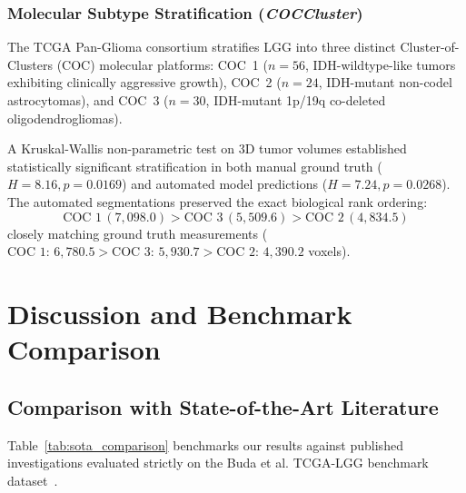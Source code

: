 \documentclass[preprint,3p,times,onecolumn]{elsarticle}
\begin{document}
\subsubsection{Molecular Subtype Stratification (\textit{COCCluster})}
The TCGA Pan-Glioma consortium stratifies LGG into three distinct Cluster-of-Clusters (COC) molecular platforms: COC~1 ($n=56$, IDH-wildtype-like tumors exhibiting clinically aggressive growth), COC~2 ($n=24$, IDH-mutant non-codel astrocytomas), and COC~3 ($n=30$, IDH-mutant 1p/19q co-deleted oligodendrogliomas).

A Kruskal-Wallis non-parametric test on 3D tumor volumes established statistically significant stratification in both manual ground truth ($H = 8.16, p = \mathbf{0.0169}$) and automated model predictions ($H = 7.24, p = \mathbf{0.0268}$). The automated segmentations preserved the exact biological rank ordering:
\begin{equation}
\text{COC 1}\,(7{,}098.0) > \text{COC 3}\,(5{,}509.6) > \text{COC 2}\,(4{,}834.5)
\end{equation}
closely matching ground truth measurements ($\text{COC 1: } 6{,}780.5 > \text{COC 3: } 5{,}930.7 > \text{COC 2: } 4{,}390.2$ voxels).

\section{Discussion and Benchmark Comparison}
\label{sec:discussion}

\subsection{Comparison with State-of-the-Art Literature}
Table~\ref{tab:sota_comparison} benchmarks our results against published investigations evaluated strictly on the Buda et al. TCGA-LGG benchmark dataset~\cite{buda2019association}.
\end{document}
